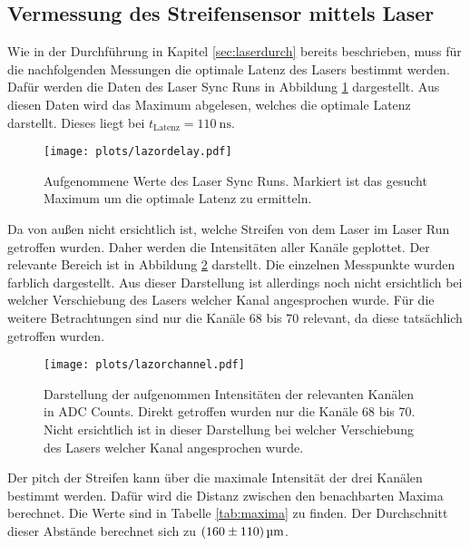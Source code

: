 \subsection{Vermessung des Streifensensor mittels Laser}

Wie in der Durchführung in Kapitel \ref{sec:laserdurch} bereits beschrieben, muss für die nachfolgenden Messungen die optimale Latenz des Lasers bestimmt werden.
Dafür werden die Daten des Laser Sync Runs in Abbildung \ref{fig:lazordelay} dargestellt.
Aus diesen Daten wird das Maximum abgelesen, welches die optimale Latenz darstellt.
Dieses liegt bei $t_\text{Latenz} = \SI{110}{\nano\second}$.

\begin{figure}
  \centering
  \texttt{[image: plots/lazordelay.pdf]}
  \caption{Aufgenommene Werte des Laser Sync Runs. Markiert ist das gesucht Maximum um die optimale Latenz zu ermitteln.}
  \label{fig:lazordelay}
\end{figure}

Da von außen nicht ersichtlich ist, welche Streifen von dem Laser im Laser Run getroffen wurden.
Daher werden die Intensitäten aller Kanäle geplottet.
Der relevante Bereich ist in Abbildung \ref{fig:lazorchannel} darstellt.
Die einzelnen Messpunkte wurden farblich dargestellt.
Aus dieser Darstellung ist allerdings noch nicht ersichtlich bei welcher Verschiebung des Lasers welcher Kanal angesprochen wurde.
Für die weitere Betrachtungen sind nur die Kanäle 68 bis 70 relevant, da diese tatsächlich getroffen wurden.

\begin{figure}
  \centering
  \texttt{[image: plots/lazorchannel.pdf]}
  \caption{Darstellung der aufgenommen Intensitäten der relevanten Kanälen in ADC Counts. Direkt getroffen wurden nur die Kanäle 68 bis 70. Nicht ersichtlich ist in dieser Darstellung bei welcher Verschiebung des Lasers welcher Kanal angesprochen wurde.}
  \label{fig:lazorchannel}
\end{figure}

Der pitch der Streifen kann über die maximale Intensität der drei Kanälen bestimmt werden.
Dafür wird die Distanz zwischen den benachbarten Maxima berechnet.
Die Werte sind in Tabelle \ref{tab:maxima} zu finden.
Der Durchschnitt dieser Abstände berechnet sich zu $\SI{160 \pm 110}{\micro\metre}$.

